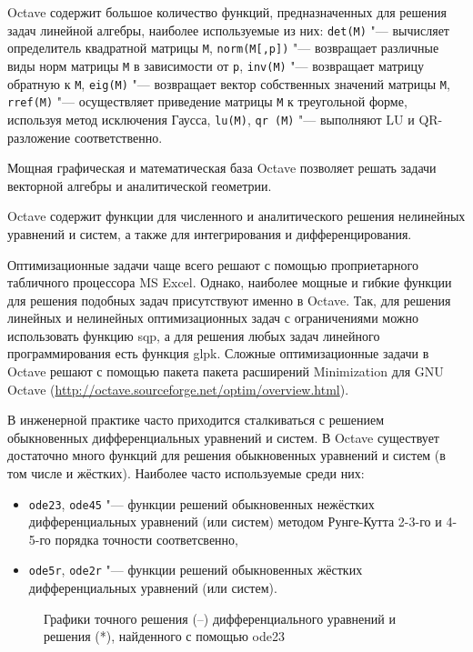 \documentclass[10pt, a5paper]{article}
\begin{document}
Octave содержит большое количество функций, предназначенных для решения задач линейной алгебры, наиболее используемые из них: \verb!det(M)! "--- вычисляет определитель квадратной матрицы \verb!M!, \verb!norm(M[,p])! "--- возвращает различные виды норм матрицы \verb!M! в зависимости от \verb!p!, \verb!inv(M)! "--- возвращает матрицу обратную к \verb!M!, \verb!eig(M)! "--- возвращает вектор собственных значений матрицы \verb!M!, \verb!rref(M)! "--- осуществляет приведение матрицы \verb!M! к треугольной форме, используя метод исключения Гаусса, \verb!lu(M)!, \verb!qr (M)! "--- выполняют LU и QR-разложение соответственно. 

Мощная графическая и математическая база  Octave позволяет решать задачи векторной алгебры и аналитической геометрии.

Octave содержит функции для численного и аналитического решения нелинейных уравнений и систем, а также для интегрирования и дифференцирования.

Оптимизационные задачи чаще всего решают с помощью проприетарного табличного процессора MS Excel. Однако, наиболее мощные и гибкие функции для решения подобных задач присутствуют именно в Octave. Так, для  решения линейных и нелинейных оптимизационных задач с ограничениями можно использовать функцию sqp, а для решения любых задач линейного программирования есть функция glpk. Сложные оптимизационные задачи в Octave решают с помощью пакета пакета расширений Minimization для GNU Octave (\url{http://octave.sourceforge.net/optim/overview.html}).

В инженерной практике часто приходится сталкиваться с решением обыкновенных дифференциальных уравнений и систем. В Octave существует достаточно много функций для решения обыкновенных уравнений и систем (в том числе и жёстких). Наиболее часто используемые среди них:
\begin{itemize}
\item \verb!ode23!, \verb!ode45! "--- функции решений обыкновенных нежёстких дифференциальных уравнений (или систем) методом Рунге-Кутта 2-3-го и 4-5-го порядка точности соответсвенно,
\item \verb!ode5r!, \verb!ode2r! "--- функции решений обыкновенных жёстких дифференциальных уравнений (или систем).
\end{itemize}

\begin{figure}[ht]
\caption{Графики точного решения (--) дифференциального уравнений и решения (*), найденного с помощью ode23}
\label{pic:4}
\end{figure}
\end{document}
